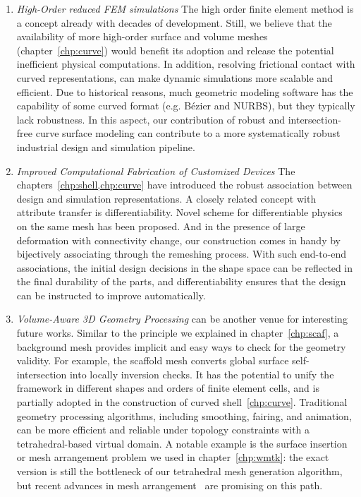 \begin{enumerate}
\item \emph{High-Order reduced FEM simulations}
The high order finite element method is a concept already with decades of development. Still, we believe that the availability of more high-order surface and volume meshes (chapter~\ref{chp:curve}) would benefit its adoption and release the potential inefficient physical computations. In addition, resolving frictional contact with curved representations, \cite{ferguson2022high} can make dynamic simulations more scalable and efficient. 
Due to historical reasons, much geometric modeling software has the capability of some curved format (e.g. B{\'e}zier and NURBS), but they typically lack robustness. In this aspect, our contribution of robust and intersection-free curve surface modeling can contribute to a more systematically robust industrial design and simulation pipeline.

\item \emph{Improved Computational Fabrication of Customized Devices}
The chapters~\ref{chp:shell,chp:curve} have introduced the robust association between design and simulation representations. A closely related concept with attribute transfer is differentiability. Novel scheme for differentiable physics on the same mesh has been proposed. And in the presence of large deformation with connectivity change, our construction comes in handy by bijectively associating through the remeshing process. 
With such end-to-end associations, the initial design decisions in the shape space can be reflected in the final durability of the parts, and differentiability ensures that the design can be instructed to improve automatically.  

\item \emph{Volume-Aware 3D Geometry Processing}
can be another venue for interesting future works. 
Similar to the principle we explained in chapter~\ref{chp:scaf}, a background mesh provides implicit and easy ways to check for the geometry validity. For example, the scaffold mesh converts global surface self-intersection into locally inversion checks. It has the potential to unify the framework in different shapes and orders of finite element cells, and is partially adopted in the construction of curved shell~\ref{chp:curve}. Traditional geometry processing algorithms, including smoothing, fairing, and animation, can be more efficient and reliable under topology constraints with a tetrahedral-based virtual domain. A notable example is the surface insertion or mesh arrangement problem we used in chapter~\ref{chp:wmtk}: the exact version is still the bottleneck of our tetrahedral mesh generation algorithm, but recent advances in mesh arrangement~\cite{Hu:2019:fTetWild,zhou2016mesh,ember2022} are promising on this path.


\end{enumerate}
